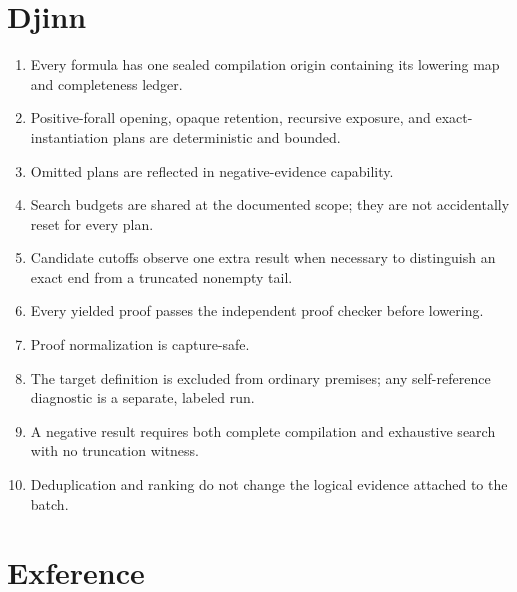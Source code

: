 \documentclass[10pt,letterpaper,oneside]{report}
\begin{document}
\section{Djinn}

\begin{enumerate}
  \item Every formula has one sealed compilation origin containing its lowering map and completeness ledger.
  \item Positive-forall opening, opaque retention, recursive exposure, and exact-instantiation plans are deterministic and bounded.
  \item Omitted plans are reflected in negative-evidence capability.
  \item Search budgets are shared at the documented scope; they are not accidentally reset for every plan.
  \item Candidate cutoffs observe one extra result when necessary to distinguish an exact end from a truncated nonempty tail.
  \item Every yielded proof passes the independent proof checker before lowering.
  \item Proof normalization is capture-safe.
  \item The target definition is excluded from ordinary premises; any self-reference diagnostic is a separate, labeled run.
  \item A negative result requires both complete compilation and exhaustive search with no truncation witness.
  \item Deduplication and ranking do not change the logical evidence attached to the batch.
\end{enumerate}

\section{Exference}
\end{document}
